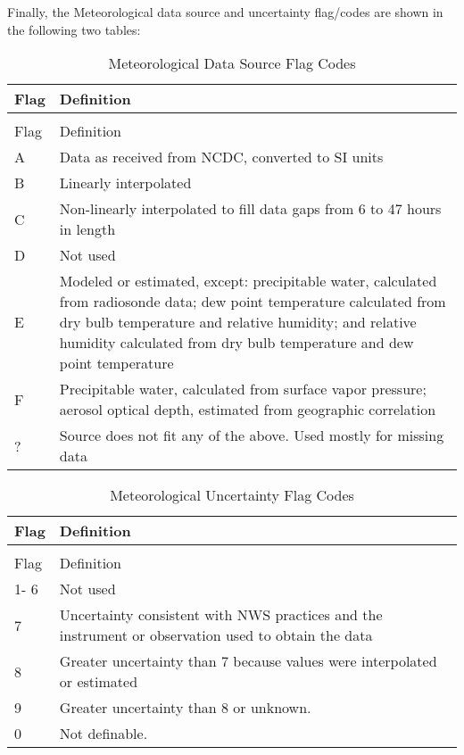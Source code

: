 Finally, the Meteorological data source and uncertainty flag/codes are shown in the following two tables:

\begin{longtable}[c]{p{1.5in}p{4.5in}}
\caption{Meteorological Data Source Flag Codes \label{table:meteorological-data-source-flag-codes}} \tabularnewline
\toprule 
Flag & Definition \tabularnewline \midrule
\endfirsthead

\caption[]{Meteorological Data Source Flag Codes} \tabularnewline
\toprule 
Flag & Definition \tabularnewline \midrule
\endhead

A & Data as received from NCDC, converted to SI units \tabularnewline
B & Linearly interpolated \tabularnewline
C & Non-linearly interpolated to fill data gaps from 6 to 47 hours in length \tabularnewline
D & Not used \tabularnewline
E & Modeled or estimated, except: precipitable water, calculated from radiosonde data; dew point temperature calculated from dry bulb temperature and relative humidity; and relative humidity calculated from dry bulb temperature and dew point temperature \tabularnewline
F & Precipitable water, calculated from surface vapor pressure; aerosol optical depth, estimated from geographic correlation \tabularnewline
? & Source does not fit any of the above. Used mostly for missing data \tabularnewline
\bottomrule
\end{longtable}

\begin{longtable}[c]{p{1.5in}p{4.5in}}
\caption{Meteorological Uncertainty Flag Codes \label{table:meteorological-uncertainty-flag-codes}} \tabularnewline
\toprule 
Flag & Definition \tabularnewline \midrule
\endfirsthead

\caption[]{Meteorological Uncertainty Flag Codes} \tabularnewline
\toprule 
Flag & Definition \tabularnewline \midrule
\endhead

1- 6 & Not used \tabularnewline
7 & Uncertainty consistent with NWS practices and the instrument or observation used to obtain the data \tabularnewline
8 & Greater uncertainty than 7 because values were interpolated or estimated \tabularnewline
9 & Greater uncertainty than 8 or unknown. \tabularnewline
0 & Not definable. \tabularnewline
\bottomrule
\end{longtable}
